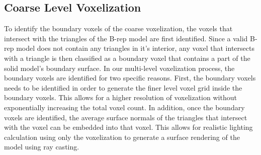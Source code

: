 \documentclass[10pt,letterpaper]{article}
\begin{document}
\subsection{Coarse Level Voxelization}
To identify the boundary voxels of the coarse voxelization, the voxels that intersect with the triangles of the B-rep model are first identified. Since a valid B-rep model does not contain any triangles in it's interior, any voxel that intersects with a triangle is then classified as a boundary voxel that contains a part of the solid model's boundary surface. In our multi-level voxelization process, the boundary voxels are identified for two specific reasons. First, the boundary voxels needs to be identified in order to generate the finer level voxel grid inside the boundary voxels. This allows for a higher resolution of voxelization without exponentially increasing the total voxel count. In addition, once the boundary voxels are identified, the average surface normals of the triangles that intersect with the voxel can be embedded into that voxel. This allows for realistic lighting calculation using only the voxelization to generate a surface rendering of the model using ray casting.
\end{document}
